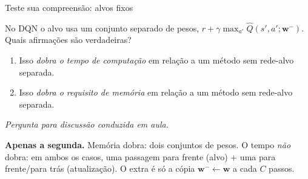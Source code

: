 \documentclass[aspectratio=169, 11pt]{beamer}
\newcommand{\paradiscussao}{\smallskip
  {\footnotesize\color{rlCinza}\itshape Pergunta para discussão conduzida em aula.}}
\newcommand{\Qhat}{\widehat{Q}}
\newcommand{\wv}{\mathbf{w}}
\newcommand{\wtar}{\mathbf{w}^{-}}
\begin{document}
\begin{frame}{Teste sua compreensão: alvos fixos}

  \begin{quizbox}{}
    No DQN o alvo usa um conjunto separado de pesos,
    $r + \gamma\max_{a'}\Qhat(s',a';\wtar)$. Quais afirmações são
    verdadeiras?
    \begin{enumerate}\setlength{\itemsep}{0.2ex}
      \item Isso \emph{dobra o tempo de computação} em relação a um método
        sem rede-alvo separada.
      \item Isso \emph{dobra o requisito de memória} em relação a um método
        sem rede-alvo separada.
    \end{enumerate}
  \end{quizbox}
  \paradiscussao

  \pause
  \begin{respbox}
    \textbf{Apenas a segunda.} Memória dobra: dois conjuntos de pesos. O
    tempo \emph{não} dobra: em ambos os casos, uma passagem para frente
    (alvo) + uma para frente/para trás (atualização). O extra é só a cópia
    $\wtar \leftarrow \wv$ a cada $C$ passos.
  \end{respbox}
\end{frame}
\end{document}
